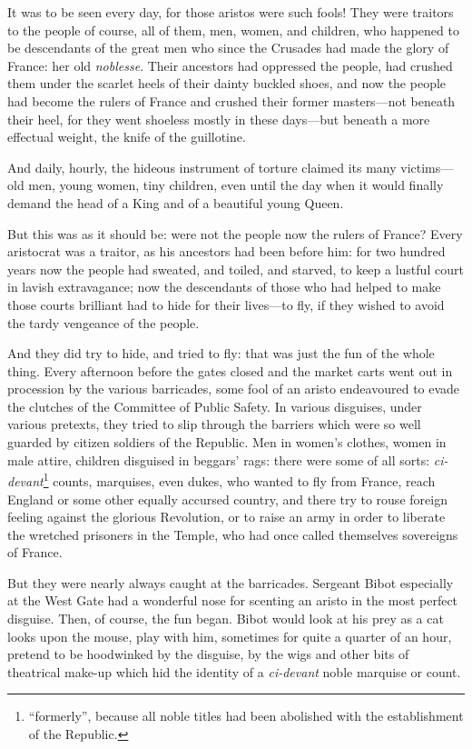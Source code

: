 \documentclass[paper=a5,BCOR=7mm,twoside,DIV=calc,12pt,usegeometry,chapterprefix,endperiod,headings=big]{scrbook}
\begin{document}
It was to be seen every day, for those aristos were such fools! They were traitors to the people of course, all of them, men, wo\-men, and children, who happened to be descendants of the great men who since the Crusades had made the glory of France: her old \textit{noblesse}. Their ancestors had oppressed the people, had crushed them under the scarlet heels of their dainty buckled shoes, and now the people had become the rulers of France and crushed their former masters---not beneath their heel, for they went shoeless mostly in these days---but beneath a more effectual weight, the knife of the guillotine.

And daily, hourly, the hideous instrument of torture claimed its many victims---old men, young women, tiny children, even until the day when it would finally demand the head of a King and of a beautiful young Queen.

But this was as it should be: were not the people now the rulers of France? Every aristocrat was a traitor, as his ancestors had been before him: for two hundred years now the people had sweated, and toiled, and starved, to keep a lustful court in lavish extravagance; now the descendants of those who had helped to make those courts brilliant had to hide for their lives---to fly, if they wished to avoid the tardy vengeance of the people.

And they did try to hide, and tried to fly: that was just the fun of the whole thing. Every afternoon before the gates closed and the market carts went out in procession by the various barricades, some fool of an aristo endeavoured to evade the clutches of the Committee of Public Safety. In various disguises, under various pretexts, they tried to slip through the barriers which were so well guarded by citizen soldiers of the Republic. Men in women's clothes, women in male attire, children disguised in beggars’ rags: there were some of all sorts: \textit{ci-devant}\footnote{\enquote{formerly}, because all noble titles had been abolished with the establishment of the Republic.} counts, marquises, even dukes, who wanted to fly from France, reach England or some other equally accursed country, and there try to rouse foreign feeling against the glorious Revolution, or to raise an army in order to liberate the wretched prisoners in the Temple, who had once called themselves sovereigns of France.

But they were nearly always caught at the barricades. \newline Sergeant Bibot especially at the West Gate had a wonderful nose for scenting an aristo in the most perfect disguise. Then, of course, the fun began. Bibot would look at his prey as a cat looks upon the mouse, play with him, sometimes for quite a quarter of an hour, pretend to be hoodwinked by the disguise, by the wigs and other bits of theatrical make-up which hid the identity of a \textit{ci-devant} noble marquise or count.
\end{document}
